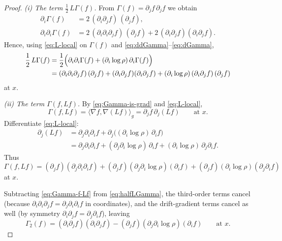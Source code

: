 \documentclass[11pt]{amsart}
\theoremstyle{definition}
\theoremstyle{remark}
\begin{document}
\begin{proof}
\smallskip
\emph{(i) The term $\frac12\,L\Gamma(f)$.}
From $\Gamma(f)=\partial_j f\,\partial_j f$ we obtain
\begin{align}
\partial_i \Gamma(f)
&=2\,(\partial_i\partial_j f)\,(\partial_j f),
\label{eq:dGamma}\\
\partial_i\partial_i \Gamma(f)
&=2\,(\partial_i\partial_i\partial_j f)\,(\partial_j f)
+2\,(\partial_i\partial_j f)(\partial_i\partial_j f).
\label{eq:ddGamma}
\end{align}
Hence, using \eqref{eq:L-local} on $\Gamma(f)$ and \eqref{eq:ddGamma}--\eqref{eq:dGamma},
\begin{align}
\frac12\,L\Gamma(f)
&=\frac12\Bigl(\partial_i\partial_i\Gamma(f) + (\partial_i\log\rho)\,\partial_i\Gamma(f)\Bigr)
\nonumber\\
&=(\partial_i\partial_i\partial_j f)\,(\partial_j f)
+(\partial_i\partial_j f)(\partial_i\partial_j f)
+(\partial_i\log\rho)\,(\partial_i\partial_j f)\,(\partial_j f)
\label{eq:halfLGamma}
\end{align}
at $x$.

\smallskip
\emph{(ii) The term $\Gamma(f,Lf)$.}
By \eqref{eq:Gamma-is-grad} and \eqref{eq:L-local},
\[
\Gamma(f,Lf)=\langle \nabla f,\nabla(Lf)\rangle_g
=\partial_j f\,\partial_j(Lf)
\qquad\text{at }x.
\]
Differentiate \eqref{eq:L-local}:
\begin{align}
\partial_j(Lf)
&=\partial_j\partial_i\partial_i f
+\partial_j\bigl((\partial_i\log\rho)\,\partial_i f\bigr)
\nonumber\\
&=\partial_j\partial_i\partial_i f
+(\partial_j\partial_i\log\rho)\,\partial_i f
+(\partial_i\log\rho)\,\partial_j\partial_i f .
\label{eq:dLf}
\end{align}
Thus
\begin{equation}\label{eq:Gamma-f-Lf}
\Gamma(f,Lf)
=(\partial_j f)(\partial_j\partial_i\partial_i f)
+(\partial_j f)(\partial_j\partial_i\log\rho)(\partial_i f)
+(\partial_j f)(\partial_i\log\rho)(\partial_j\partial_i f)
\end{equation}
at $x$.

\smallskip
Subtracting \eqref{eq:Gamma-f-Lf} from \eqref{eq:halfLGamma}, the third-order terms cancel
(because $\partial_i\partial_i\partial_j f=\partial_j\partial_i\partial_i f$ in coordinates),
and the drift-gradient terms cancel as well (by symmetry $\partial_i\partial_j f=\partial_j\partial_i f$), leaving
\begin{equation}\label{eq:Gamma2-pointwise-expanded}
\Gamma_2(f)
=(\partial_i\partial_j f)(\partial_i\partial_j f)
-(\partial_j f)(\partial_j\partial_i\log\rho)(\partial_i f)
\qquad\text{at }x.
\end{equation}


\end{proof}
\end{document}
